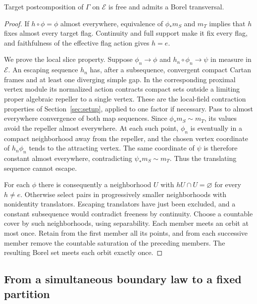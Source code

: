\begin{lemma}
\label{lem:recovery-transversal}
Target postcomposition of \(\Gamma\) on \(\mathscr E\) is free and admits
a Borel transversal.
\end{lemma}

\begin{proof}
If \(h\circ\phi=\phi\) almost everywhere, equivalence of
\(\phi_*m_S\) and \(m_T\) implies that \(h\) fixes almost every target
flag.  Continuity and full support make it fix every flag, and faithfulness
of the effective flag action gives \(h=e\).

We prove the local slice property.  Suppose
\(\phi_n\to\phi\) and \(h_n\circ\phi_n\to\psi\) in measure in
\(\mathscr E\).  An escaping sequence \(h_n\) has, after a subsequence,
convergent compact Cartan frames and at least one diverging simple gap.
In the corresponding proximal vertex module its normalized action
contracts compact sets outside a limiting proper algebraic repeller to a
single vertex.  These are the local-field contraction properties of
Section~\ref{sec:setup}, applied to one factor if necessary.
Pass to almost everywhere convergence of both map sequences.  Since
\(\phi_*m_S\sim m_T\), its values avoid the repeller almost everywhere.
At each such point, \(\phi_n\) is eventually in a compact neighborhood
away from the repeller, and the chosen vertex coordinate of
\(h_n\phi_n\) tends to the attracting vertex.  The same coordinate of
\(\psi\) is therefore constant almost everywhere, contradicting
\(\psi_*m_S\sim m_T\).  Thus the translating sequence cannot escape.

For each \(\phi\) there is consequently a neighborhood \(U\) with
\(hU\cap U=\varnothing\) for every \(h\ne e\).  Otherwise select pairs
in progressively smaller neighborhoods with nonidentity translators.
Escaping translators have just been excluded, and a constant subsequence
would contradict freeness by continuity.  Choose a countable cover by
such neighborhoods, using separability.  Each member meets an orbit at
most once.  Retain from the first member all its points, and from each
successive member remove the countable saturation of the preceding
members.  The resulting Borel set meets each orbit exactly once.
\end{proof}

\subsection{From a simultaneous boundary law to a fixed partition}

